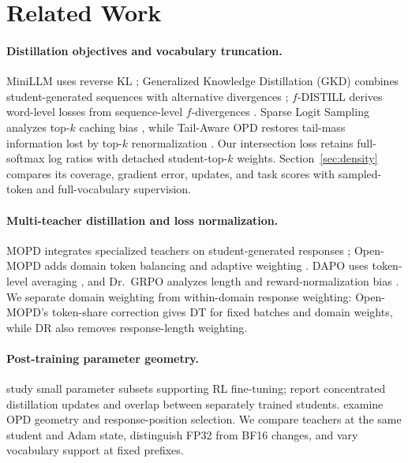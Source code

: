 \section{Related Work}

\paragraph{Distillation objectives and vocabulary truncation.}
MiniLLM uses reverse KL \citep{gu2024minillm}; Generalized Knowledge Distillation (GKD) combines student-generated sequences with alternative divergences \citep{agarwal2024gkd}; $f$-DISTILL derives word-level losses from sequence-level $f$-divergences \citep{wen2023fdivergence}. Sparse Logit Sampling analyzes top-$k$ caching bias \citep{anshumann2025sparse}, while Tail-Aware OPD restores tail-mass information lost by top-$k$ renormalization \citep{huang2026tailaware}. Our intersection loss retains full-softmax log ratios with detached student-top-$k$ weights. Section~\ref{sec:density} compares its coverage, gradient error, updates, and task scores with sampled-token and full-vocabulary supervision.

\paragraph{Multi-teacher distillation and loss normalization.}
MOPD integrates specialized teachers on student-generated responses \citep{ma2026mopdmultiteacheronpolicydistillation}; Open-MOPD adds domain token balancing and adaptive weighting \citep{gao2026openmopddiagnosingfixingcapability}. DAPO uses token-level averaging \citep{yu2025dapo}, and Dr.~GRPO analyzes length and reward-normalization bias \citep{liu2025understandingr1zero}. We separate domain weighting from within-domain response weighting: Open-MOPD's token-share correction gives DT for fixed batches and domain weights, while DR also removes response-length weighting.

\paragraph{Post-training parameter geometry.}
\citet{mukherjee2025subnetworks} study small parameter subsets supporting RL fine-tuning; \citet{yu2026denseupdates} report concentrated distillation updates and overlap between separately trained students. \citet{shen2026opdgeometry} examine OPD geometry and response-position selection. We compare teachers at the same student and Adam state, distinguish FP32 from BF16 changes, and vary vocabulary support at fixed prefixes.
